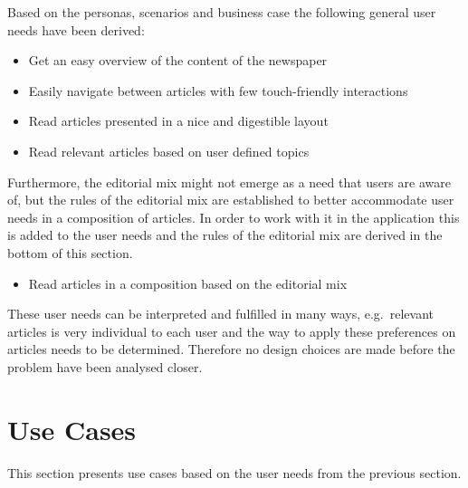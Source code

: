 Based on the personas, scenarios and business case the following general user needs have been derived:
\begin{itemize}\itemdist
	\item Get an easy overview of the content of the newspaper
	\item Easily navigate between articles with few touch-friendly interactions
	\item Read articles presented in a nice and digestible layout
	\item Read relevant articles based on user defined topics
\end{itemize}

Furthermore, the editorial mix might not emerge as a need that users are aware of, but the rules of the editorial mix are established to better accommodate user needs in a composition of articles. In order to work with it in the application this is added to the user needs and the rules of the editorial mix are derived in the bottom of this section.
\begin{itemize}\itemdist
	\item Read articles in a composition based on the editorial mix
\end{itemize}

These user needs can be interpreted and fulfilled in many ways, e.g.\ relevant articles is very individual to each user and the way to apply these preferences on articles needs to be determined. Therefore no design choices are made before the problem have been analysed closer.

\section{Use Cases}
This section presents use cases based on the user needs from the previous section.
\clearpage

